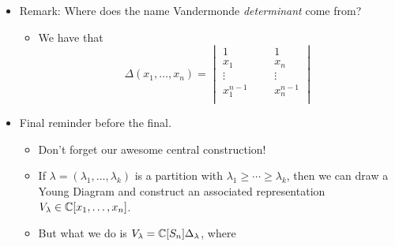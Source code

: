 \documentclass[../notes.tex]{subfiles}
\begin{document}
\begin{itemize}
\begin{proof}
        \begin{equation*}
            P = P_d(x_1-x_2)^d+P_{d-1}(x_1-x_2)^{d-1}+\cdots+P_0
        \end{equation*}
        where each $P_i\in\Q[x_1,\dots,x_d]$. What is $d$?? (Less than $n$, I'm assuming, but any other constraints?) Plugging in $x_1=x_2$ once again, we get $0=P=P_0$. But this implies that $P_0=0$. Thus, $P$ is divisible by $x_1-x_2$. Similarly, for all $i<j$, $(x_i-x_j)\mid P$. But since the $x_i-x_j$ are irreducible polynomials, we have that $\prod_{i<j}(x_j-x_i)\mid P$. This is justified because we are in a unique factorization domain (how is this relevant??). Thus, we have that $P=P'\cdot\Delta(x_1,\dots,x_n)$. Lastly, it follows that $P'\in\Q[x_1,\dots,x_n]^{S_n}$ because under any sign $-1$ permutation, $\Delta(x_1,\dots,x_n)$ will flip signs and $P$ will still be equal, so $P'$ had better just stay itself under this permutation (i.e., be symmetric).
    \end{proof}
    \item Remark: Where does the name Vandermonde \emph{determinant} come from?
    \begin{itemize}
        \item We have that
        \begin{equation*}
            \Delta(x_1,\dots,x_n) =
            \begin{vmatrix}
                1 &  &  & 1\\
                x_1 &  &  & x_n\\
                \vdots &  &  & \vdots\\
                x_1^{n-1} &  &  & x_n^{n-1}\\
            \end{vmatrix}
        \end{equation*}
    \end{itemize}
    \item Final reminder before the final.
    \begin{itemize}
        \item Don't forget our awesome central construction!
        \item If $\lambda=(\lambda_1,\dots,\lambda_k)$ is a partition with $\lambda_1\geq\cdots\geq\lambda_k$, then we can draw a Young Diagram and construct an associated representation $V_\lambda\in\mathbb{C}[x_1,\dots,x_n]$.
        \item But what we do is $V_\lambda=\mathbb{C}[S_n]\Delta_\lambda$, where
        \begin{equation*}

\end{equation*}
\end{itemize}
\end{itemize}
\end{document}
